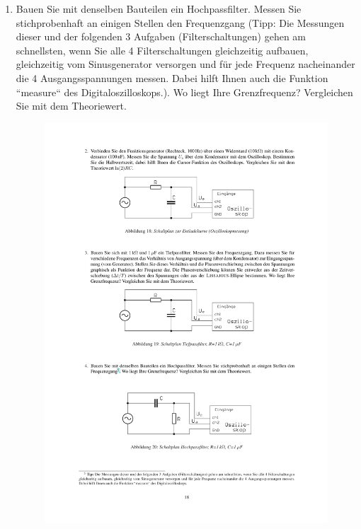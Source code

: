 \documentclass[12pt]{scrartcl}
\begin{document}
\begin{enumerate}
\begin{figure}[htbp]
  \label{fig:Tiefpass_2}
\end{figure}
\item
Bauen Sie mit denselben Bauteilen ein Hochpassfilter. Messen Sie stichprobenhaft an einigen Stellen den Frequenzgang (Tipp: Die Messungen dieser und der folgenden 3 Aufgaben (Filterschaltungen) gehen am schnellsten, wenn Sie alle 4 Filterschaltungen
gleichzeitig aufbauen, gleichzeitig vom Sinusgenerator versorgen und für jede Frequenz nacheinander die 4 Ausgangsspannungen messen.
Dabei hilft Ihnen auch die Funktion “measure“ des Digitaloszilloskops.). Wo liegt Ihre Grenzfrequenz? Vergleichen Sie mit dem Theoriewert.
\begin{figure}[htbp] 
  \centering
    \includegraphics[trim = 20mm 60mm 1mm 190mm, clip, scale = 1]{tiefpass.pdf}

\end{figure}
\end{enumerate}
\end{document}
